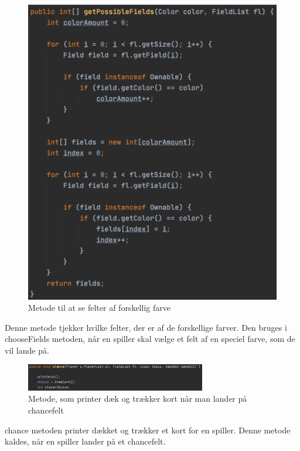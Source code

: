 \begin{figure}[H]
    \centering
    \includegraphics{sources/7_implementering/ControllerGetFields.png}
    \caption{Metode til at se felter af forskellig farve}
    \label{fig:possibleFields}
\end{figure}
Denne metode tjekker hvilke felter, der er af de forskellige farver. Den bruges i chooseFields metoden, når en spiller skal vælge et felt af en speciel farve, som de vil lande på.


\begin{figure}[H]
    \centering
    \includegraphics[width=0.7\textwidth]{sources/7_implementering/ControllerChance.png}
    \caption{Metode, som printer dæk og trækker kort når man lander på chancefelt}
    \label{fig:controllerChance}
\end{figure}

chance metoden printer dækket og trækker et kort for en spiller. Denne metode kaldes, når en spiller lander på et chancefelt. 

